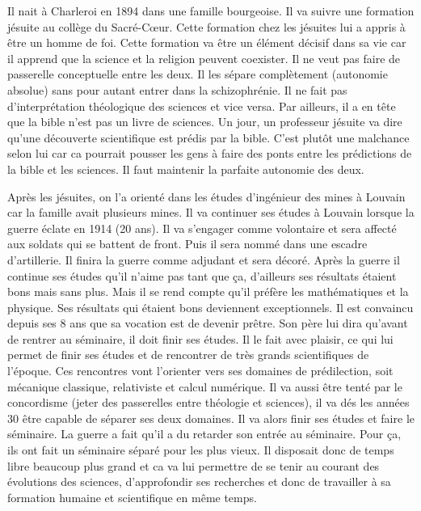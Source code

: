 \documentclass[11pt,a4paper]{article} %
\begin{document}
Il nait à Charleroi en 1894 dans une famille bourgeoise.
Il va suivre une formation jésuite au collège du Sacré-Cœur.
Cette formation chez les jésuites lui a appris à être un homme de foi.
Cette formation va être un élément décisif dans sa vie car il apprend que la science et la religion peuvent coexister.
Il ne veut pas faire de passerelle conceptuelle entre les deux.
Il les sépare complètement (autonomie absolue) sans pour autant entrer dans la schizophrénie.
Il ne fait pas d'interprétation théologique des sciences et vice versa.
Par ailleurs, il a en tête que la bible n'est pas un livre de sciences.
Un jour, un professeur jésuite va dire qu'une découverte scientifique est prédis par la bible.
C'est plutôt une malchance selon lui car ca pourrait pousser les gens à faire des ponts entre les prédictions de la bible et les sciences.
Il faut maintenir la parfaite autonomie des deux.

Après les jésuites, on l'a orienté dans les études d'ingénieur des mines à Louvain car la famille avait plusieurs mines.
Il va continuer ses études à Louvain lorsque la guerre éclate en 1914 (20 ans).
Il va s'engager comme volontaire et sera affecté aux soldats qui se battent de front.
Puis il sera nommé dans une escadre d'artillerie.
Il finira la guerre comme adjudant et sera décoré.
Après la guerre il continue ses études qu'il n'aime pas tant que ça, d'ailleurs ses résultats étaient bons mais sans plus.
Mais il se rend compte qu'il préfère les mathématiques et la physique.
Ses résultats qui étaient bons deviennent exceptionnels.
Il est convaincu depuis ses 8 ans que sa vocation est de devenir prêtre.
Son père lui dira qu'avant de rentrer au séminaire, il doit finir ses études.
Il le fait avec plaisir, ce qui lui permet de finir ses études et de rencontrer de très grands scientifiques de l'époque.
Ces rencontres vont l'orienter vers ses domaines de prédilection, soit mécanique classique, relativiste et calcul numérique.
Il va aussi être tenté par le concordisme (jeter des passerelles entre théologie et sciences), il va dés les années 30 être capable de séparer ses deux domaines.
Il va alors finir ses études et faire le séminaire.
La guerre a fait qu'il a du retarder son entrée au séminaire.
Pour ça, ils ont fait un séminaire séparé pour les plus vieux.
Il disposait donc de temps libre beaucoup plus grand et ca va lui permettre de se tenir au courant des évolutions des sciences, d'approfondir ses recherches et donc de travailler à sa formation humaine et scientifique en même temps.
\end{document}
